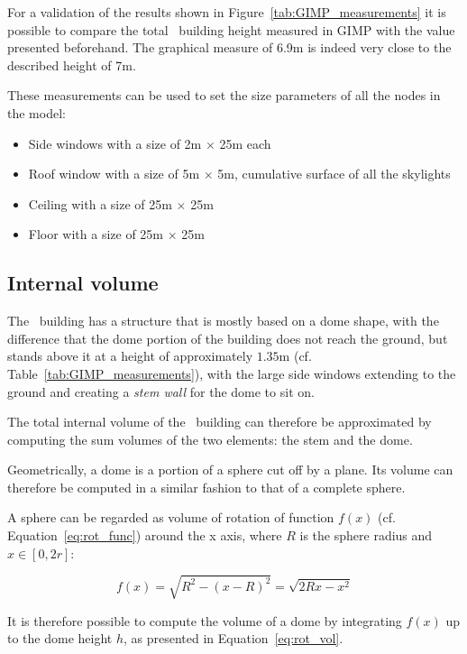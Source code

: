 For a validation of the results shown in Figure~\ref{tab:GIMP_measurements} it
is possible to compare the total \pdome\ building height measured in GIMP with
the value presented beforehand. The graphical measure of 6.9m is indeed very
close to the described height of 7m.

These measurements can be used to set the size parameters of all the nodes in
the model:

\begin{itemize}
    \item Side windows with a size of 2m $\times$ 25m each
    \item Roof window with a size of 5m $\times$ 5m, cumulative surface of all
        the skylights
    \item Ceiling with a size of 25m $\times$ 25m
    \item Floor with a size of 25m $\times$ 25m
\end{itemize}

\subsection{Internal volume}

The \pdome\ building has a structure that is mostly based on a dome shape, with
the difference that the dome portion of the building does not reach the ground,
but stands above it at a height of approximately $1.35$m (cf.
Table~\ref{tab:GIMP_measurements}), with the large side windows extending to the
ground and creating a \textit{stem wall} for the dome to sit on.

The total internal volume of the \pdome\ building can therefore be approximated
by computing the sum volumes of the two elements: the stem and the dome.

Geometrically, a dome is a portion of a sphere cut off by a plane. Its volume
can therefore be computed in a similar fashion to that of a complete sphere.

A sphere can be regarded as volume of rotation of function $f(x)$ (cf.
Equation~\ref{eq:rot_func}) around the x axis, where $R$ is the sphere radius
and $x \in [0, 2r]$: 

\begin{equation}\label{eq:rot_func}
    f(x) = \sqrt{R^2 - (x-R)^2} = \sqrt{2Rx - x^2}
\end{equation}

It is therefore possible to compute the volume of a dome by integrating $f(x)$
up to the dome height $h$, as presented in Equation~\ref{eq:rot_vol}. 

